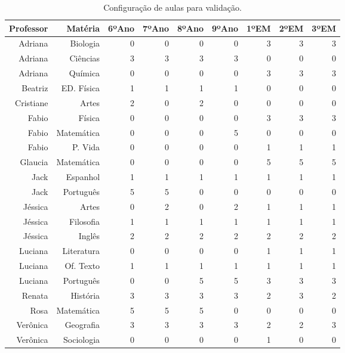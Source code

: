 \begin{table}[h]
	\centering
	\caption[Configuração de aulas para validação]{Configuração de aulas para validação.
		\label{tab:validacao}}
	\begin{tabular}{rrrrrrrrr}
		\toprule
		Professor & Matéria & 6ºAno & 7ºAno & 8ºAno & 9ºAno & 1ºEM & 2ºEM & 3ºEM \\
		\midrule
		Adriana & Biologia & 0 & 0 & 0 & 0 & 3 & 3 & 3 \\
		Adriana & Ciências & 3 & 3 & 3 & 3 & 0 & 0 & 0 \\
		Adriana & Química & 0 & 0 & 0 & 0 & 3 & 3 & 3 \\
		Beatriz & ED. Física & 1 & 1 & 1 & 1 & 0 & 0 & 0 \\
		Cristiane & Artes & 2 & 0 & 2 & 0 & 0 & 0 & 0 \\
		Fabio & Física & 0 & 0 & 0 & 0 & 3 & 3 & 3 \\
		Fabio & Matemática & 0 & 0 & 0 & 5 & 0 & 0 & 0 \\
		Fabio & P. Vida & 0 & 0 & 0 & 0 & 1 & 1 & 1 \\
		Glaucia & Matemática & 0 & 0 & 0 & 0 & 5 & 5 & 5 \\
		Jack & Espanhol & 1 & 1 & 1 & 1 & 1 & 1 & 1 \\
		Jack & Português & 5 & 5 & 0 & 0 & 0 & 0 & 0 \\
		Jéssica & Artes & 0 & 2 & 0 & 2 & 1 & 1 & 1 \\
		Jéssica & Filosofia & 1 & 1 & 1 & 1 & 1 & 1 & 1 \\
		Jéssica & Inglês & 2 & 2 & 2 & 2 & 2 & 2 & 2 \\
		Luciana & Literatura & 0 & 0 & 0 & 0 & 1 & 1 & 1 \\
		Luciana & Of. Texto & 1 & 1 & 1 & 1 & 1 & 1 & 1 \\
		Luciana & Português & 0 & 0 & 5 & 5 & 3 & 3 & 3 \\
		Renata & História & 3 & 3 & 3 & 3 & 2 & 3 & 2 \\
		Rosa & Matemática & 5 & 5 & 5 & 0 & 0 & 0 & 0 \\
		Verônica & Geografia & 3 & 3 & 3 & 3 & 2 & 2 & 3 \\
		Verônica & Sociologia & 0 & 0 & 0 & 0 & 1 & 0 & 0 \\
		\bottomrule
	\end{tabular}
\end{table}
